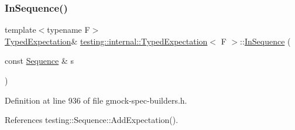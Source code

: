 \subsubsection{\texorpdfstring{In\+Sequence()}{InSequence()}\hspace{0.1cm}{\footnotesize\ttfamily [1/5]}}
{\footnotesize\ttfamily template$<$typename F$>$ \\
\hyperlink{classtesting_1_1internal_1_1TypedExpectation}{Typed\+Expectation}\& \hyperlink{classtesting_1_1internal_1_1TypedExpectation}{testing\+::internal\+::\+Typed\+Expectation}$<$ F $>$\+::\hyperlink{classtesting_1_1InSequence}{In\+Sequence} (\begin{DoxyParamCaption}\item[{const \hyperlink{classtesting_1_1Sequence}{Sequence} \&}]{s }\end{DoxyParamCaption})\hspace{0.3cm}{\ttfamily [inline]}}



Definition at line 936 of file gmock-\/spec-\/builders.\+h.



References testing\+::\+Sequence\+::\+Add\+Expectation().


